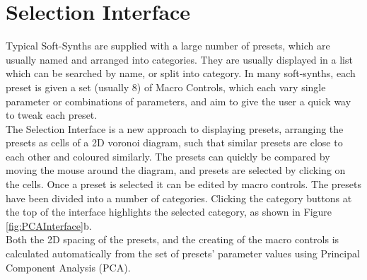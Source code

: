 \documentclass[11pt, oneside]{report}   	%
\begin{document}
\section{Selection Interface}
Typical Soft-Synths are supplied with a large number of presets, which are usually named and arranged into categories. They are usually displayed in a list which can be searched by name, or split into category. In many soft-synths, each preset is given a set (usually 8) of Macro Controls, which each vary single parameter or combinations of parameters, and aim to give the user a quick way to tweak each preset.\\
The Selection Interface is a new approach to displaying presets, arranging the presets as cells of a 2D voronoi diagram, such that similar presets are close to each other and coloured similarly. The presets can quickly be compared by moving the mouse around the diagram, and presets are selected by clicking on the cells. Once a preset is selected it can be edited by macro controls. 
The presets have been divided into a number of categories. Clicking the category buttons at the top of the interface highlights the selected category, as shown in Figure \ref{fig:PCAInterface}b.\\
Both the 2D spacing of the presets, and the creating of the macro controls is calculated automatically from the set of presets' parameter values using Principal Component Analysis (PCA).
\end{document}
